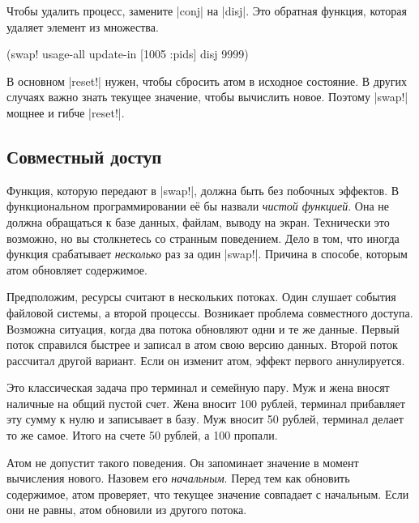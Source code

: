 Чтобы удалить процесс, замените \spverb|conj| на \spverb|disj|. Это обратная
функция, которая удаляет элемент из множества.


\begin{english}
  \begin{clojure}
(swap! usage-all update-in [1005 :pids] disj 9999)
  \end{clojure}
\end{english}

В основном \spverb|reset!| нужен, чтобы сбросить атом в исходное состояние. В
других случаях важно знать текущее значение, чтобы вычислить новое. Поэтому
\spverb|swap!| мощнее и гибче \spverb|reset!|.

\subsection{Совместный доступ}


Функция, которую передают в \spverb|swap!|, должна быть без побочных эффектов. В
функциональном программировании е\"{е} бы назвали \emph{чистой функцией}. Она не
должна обращаться к базе данных, файлам, выводу на экран. Технически это
возможно, но вы столкнетесь со странным поведением. Дело в том, что иногда
функция срабатывает \emph{несколько} раз за один \spverb|swap!|. Причина в
способе, которым атом обновляет содержимое.

Предположим, ресурсы считают в нескольких потоках. Один слушает события файловой
системы, а второй процессы. Возникает проблема совместного доступа. Возможна
ситуация, когда два потока обновляют одни и те же данные. Первый поток справился
быстрее и записал в атом свою версию данных. Второй поток рассчитал другой
вариант. Если он изменит атом, эффект первого аннулируется.


Это классическая задача про терминал и семейную пару. Муж и жена вносят наличные
на общий пустой счет. Жена вносит 100 рублей, терминал прибавляет эту сумму к
нулю и записывает в базу. Муж вносит 50 рублей, терминал делает то же
самое. Итого на счете 50 рублей, а 100 пропали.

Атом не допустит такого поведения. Он запоминает значение в момент вычисления
нового. Назовем его \emph{начальным}. Перед тем как обновить содержимое, атом
проверяет, что текущее значение совпадает с начальным. Если они не равны, атом
обновили из другого потока.

